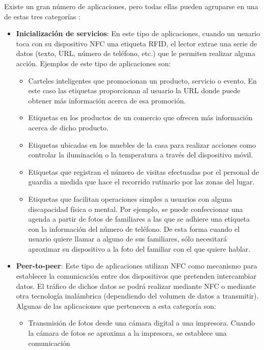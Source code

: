 Existe un gran número de aplicaciones, pero todas ellas pueden agruparse en
una de estas tres categorías \cite{bib:nfcComparison}:
\begin{itemize}
\item \textbf{Inicialización de servicios}: 
En este tipo de aplicaciones, cuando un usuario toca con su dispositivo
\acs{NFC} una etiqueta \acs{RFID}, el lector extrae una serie de datos
(texto, \acs{URL}, número de teléfono, etc.) que le permiten realizar alguna
acción. Ejemplos de este tipo de aplicaciones son:
  \begin{itemize}
  \item Carteles inteligentes que promocionan un producto, servicio o evento. 
  En este caso las etiquetas proporcionan al usuario la \acs{URL} donde puede 
  obtener más información acerca de esa promoción.
  \item Etiquetas en los productos de un comercio que ofrecen más información
  acerca de dicho producto.
  \item Etiquetas ubicadas en los muebles de la casa para realizar acciones
  como controlar la iluminación o la temperatura a través del dispositivo
  móvil.
  \item Etiquetas que registran el número de visitas efectuadas por el
  personal de guardia a medida que hace el recorrido rutinario por las zonas
  del lugar.
  \item Etiquetas que facilitan operaciones simples a usuarios con alguna
  discapacidad física o mental. Por ejemplo, se puede confeccionar una agenda
  a partir de fotos de familiares a las que se adhiere una etiqueta con la
  información del número de teléfono. De esta forma cuando el usuario quiere
  llamar a alguno de sus familiares, sólo necesitará aproximar su dispositivo
  a la foto del familiar con el que quiere hablar.
  \end{itemize}
\item \textbf{Peer-to-peer}:
Este tipo de aplicaciones utilizan \acs{NFC} como mecanismo para establecer
la comunicación entre dos dispositivos que pretenden intercambiar datos. El
tráfico de dichos datos se podrá realizar mediante \acs{NFC} o mediante otra
tecnología inalámbrica (dependiendo del volumen de datos a transmitir).
Algunas de las aplicaciones que pertenecen a esta categoría son:
  \begin{itemize}
  \item Transmisión de fotos desde una cámara digital a una impresora. Cuando
  la cámara de fotos se aproxima a la impresora, se establece una comunicación

\end{itemize}
\end{itemize}
